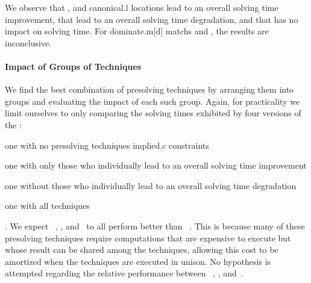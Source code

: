 We observe that , and
\gls{canonical.l} \glspl{location} lead to an overall solving time improvement,
that  lead
to an overall solving time degradation, and that
 has no impact on solving time.
%
For \gls{dominate.m}[d] \glspl{match} and
, the
results are inconclusive.


\paragraph{Impact of Groups of Techniques}

We find the best combination of \gls{presolving} techniques by arranging them
into groups and evaluating the impact of each such group.
%
Again, for practicality we limit ourselves to only comparing the solving times
exhibited by four versions of the :
%
\begin{modelList}
  \item {}
    one with no \gls{presolving} techniques
\gls{implied.c} \glspl{constraint}
  \item {}
    one with only those who individually lead to an overall solving time
    improvement
  \item {}
    one without those who individually lead to an overall solving time
    degradation
  \item {}
    one with all techniques
\end{modelList}.
%
We expect ~,
, and~ to all perform
better than ~.
%
This is because many of these \gls{presolving} techniques require computations
that are expensive to execute but whose result can be shared among the
techniques, allowing this cost to be amortized when the techniques are executed
in unison.
%
No hypothesis is attempted regarding the relative performance between
~,
, and~.


